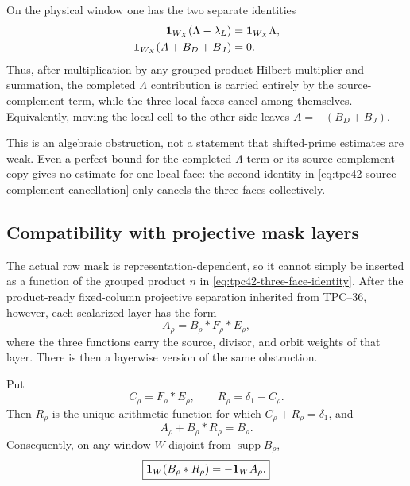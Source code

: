 \begin{corollary}
\label{cor:tpc42-source-complement-cancellation}
On the physical window one has the two separate identities
\begin{align}
 \mathbf 1_{W_X}(\Lambda-\lambda_L)&=\mathbf 1_{W_X}\Lambda,
 \label{eq:tpc42-source-complement-Lambda}\\
 \mathbf 1_{W_X}(A+B_D+B_J)&=0.
 \label{eq:tpc42-source-complement-cancellation}
\end{align}
Thus, after multiplication by any grouped-product Hilbert multiplier and
summation, the completed \(\Lambda\) contribution is carried entirely by
the source-complement term, while the three local faces cancel among
themselves.  Equivalently, moving the local cell to the other side leaves
\(A=-(B_D+B_J)\).
\end{corollary}

This is an algebraic obstruction, not a statement that shifted-prime
estimates are weak.  Even a perfect bound for the completed \(\Lambda\)
term or its source-complement copy gives no estimate for one local face:
the second identity in
\eqref{eq:tpc42-source-complement-cancellation} only cancels the three
faces collectively.

\subsection{Compatibility with projective mask layers}

The actual row mask is representation-dependent, so it cannot simply be
inserted as a function of the grouped product \(n\) in
\eqref{eq:tpc42-three-face-identity}.  After the product-ready
fixed-column projective separation inherited from TPC--36, however, each
scalarized layer has the form
\begin{equation}
 A_\rho=B_\rho*F_\rho*E_\rho,
 \label{eq:tpc42-counterterm-projective-layer}
\end{equation}
where the three functions carry the source, divisor, and orbit weights of
that layer.  There is then a layerwise version of the same obstruction.

\begin{proposition}
\label{prop:tpc42-layerwise-counterterm}
Put
\begin{equation}
 C_\rho=F_\rho*E_\rho,
 \qquad
 R_\rho=\delta_1-C_\rho.
 \label{eq:tpc42-layerwise-remainder}
\end{equation}
Then \(R_\rho\) is the unique arithmetic function for which
\(C_\rho+R_\rho=\delta_1\), and
\begin{equation}
 A_\rho+B_\rho*R_\rho=B_\rho.
 \label{eq:tpc42-layerwise-completion}
\end{equation}
Consequently, on any window \(W\) disjoint from
\(\operatorname{supp}B_\rho\),
\begin{equation}
 \boxed{
  \mathbf 1_W(B_\rho*R_\rho)=-\mathbf 1_WA_\rho.}
 \label{eq:tpc42-layerwise-counterterm}
\end{equation}
\end{proposition}

